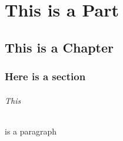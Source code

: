 




\newsavebox{\titleimage}

\title{\fontset} %

\author{Cerner Training} %




\usepackage[english]{babel}
\usepackage{blindtext}




\frontmatter

\maketitle %




\mainmatter


\part{This is a Part}
\chapter{This is a Chapter}
\section{Here is a section}
 \blindtext
\paragraph{This} is a paragraph


